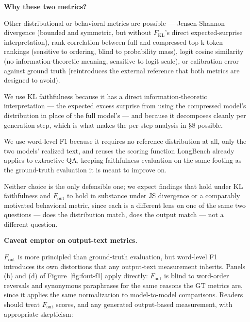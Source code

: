 \documentclass[10pt,letterpaper]{article}
\begin{document}
\textbf{Why these two metrics?}

Other distributional or behavioral
metrics are possible --- Jensen-Shannon divergence (bounded and
symmetric, but without \(F_{\text{KL}}\)'s direct expected-surprise
interpretation), rank correlation between full and compressed top-k
token rankings (sensitive to ordering, blind to probability mass), logit
cosine similarity (no information-theoretic meaning, sensitive to logit
scale), or calibration error against ground truth (reintroduces the
external reference that both metrics are designed to avoid).

We use KL faithfulness because it has a direct information-theoretic
interpretation --- the expected excess surprise from using the
compressed model's distribution in place of the full model's --- and
because it decomposes cleanly per generation step, which is what makes
the per-step analysis in §8 possible.

We use word-level F1 because it requires no reference distribution at
all, only the two models' realized text, and reuses the scoring function
LongBench already applies to extractive QA, keeping faithfulness
evaluation on the same footing as the ground-truth evaluation it is
meant to improve on.

Neither choice is the only defensible one; we
expect findings that hold under KL faithfulness and \(F_{\text{out}}\)
to hold in substance under JS divergence or a comparably motivated
behavioral metric, since each is a different lens on one of the same two
questions --- does the distribution match, does the output match --- not
a different question.

\textbf{Caveat emptor on output-text metrics.}

\nopagebreak
\(F_{\text{out}}\) is more principled than ground-truth evaluation, but word-level F1
introduces its own distortions that any output-text measurement
inherits. Panels (b) and (d) of Figure~\ref{fig:fout-f1} apply directly:
\(F_{\text{out}}\) is blind to word-order reversals and synonymous paraphrases for
the same reasons the GT metrics are, since it applies the same normalization to
model-to-model comparisons. Readers should treat \(F_{\text{out}}\) scores, and any
generated output-based measurement, with appropriate skepticism:
\end{document}
